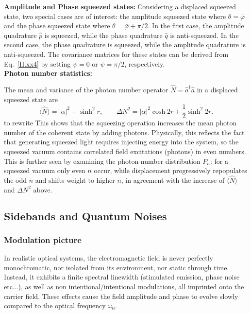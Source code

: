 \noindent \textbf{Amplitude and Phase squeezed states: }
Considering a displaced squeezed state, two special cases are of interest: the amplitude squeezed state where $\theta=\bar{\varphi}$ and the phase squeezed state where $\theta = \bar{\varphi}+\pi/2$. In the first case, the amplitude quadrature $\hat{p}$ is squeezed, while the phase quadrature $\hat{q}$ is anti-squeezed. In the second case, the phase quadrature is squeezed, while the amplitude quadrature is anti-squeezed. The covariance matrices for these states can be derived from Eq.~\eqref{II.xx4} by setting $\psi = 0$ or $\psi = \pi/2$, respectively. \\

\noindent \textbf{Photon number statistics: }

The mean and variance of the photon number operator $\hat N = \hat a^\dagger \hat a$ in a displaced squeezed state are
\begin{equation}
\langle \hat N \rangle = |\alpha|^2 + \sinh^2 r,
\qquad
\Delta N^2 = |\alpha|^2 \cosh 2r + \frac{1}{2} \sinh^2 2r.
\label{II.xx8}
\end{equation}
\color{red}
to rewrite
\color{black}
This shows that the squeezing operation increases the mean photon number of the coherent state by adding photons. Physically, this reflects the fact that generating squeezed light requires injecting energy into the system, so the squeezed vacuum contains correlated field excitations (photons) in even numbers. This is further seen by examining the photon-number distribution $P_n$: for a squeezed vacuum only even $n$ occur, while displacement progressively repopulates the odd $n$ and shifts weight to higher $n$, in agreement with the increase of $\langle \hat{N} \rangle$ and $\Delta N^2$ above.



\color{black}

\subsection{Sidebands and Quantum Noises}

\subsubsection{Modulation picture}
In realistic optical systems, the electromagnetic field is never perfectly monochromatic, nor isolated from its environment, nor static through time. Instead, it exhibits a finite spectral linewidth (stimulated emission, phase noise etc...), as well as non intentional/intentional modulations, all imprinted onto the carrier field. These effects cause the field amplitude and phase to evolve slowly compared to the optical frequency $\omega_0$. \\

